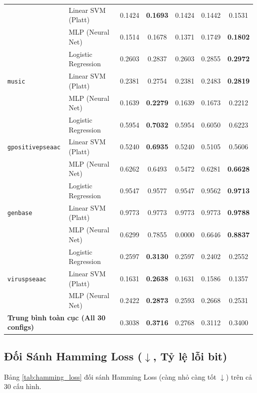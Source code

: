 \documentclass[10pt,a4paper,twoside]{article}
\begin{document}
\begin{table}[H]
{\begin{tabular}{llccccc}
 & Linear SVM (Platt) & 0.1424 & \textbf{0.1693} & 0.1424 & 0.1442 & 0.1531 \\
 & MLP (Neural Net) & 0.1514 & 0.1678 & 0.1371 & 0.1749 & \textbf{0.1802} \\
\midrule
\multirow{3}{*}{\texttt{music}} & Logistic Regression & 0.2603 & 0.2837 & 0.2603 & 0.2855 & \textbf{0.2972} \\
 & Linear SVM (Platt) & 0.2381 & 0.2754 & 0.2381 & 0.2483 & \textbf{0.2819} \\
 & MLP (Neural Net) & 0.1639 & \textbf{0.2279} & 0.1639 & 0.1673 & 0.2212 \\
\midrule
\multirow{3}{*}{\texttt{gpositivepseaac}} & Logistic Regression & 0.5954 & \textbf{0.7032} & 0.5954 & 0.6050 & 0.6223 \\
 & Linear SVM (Platt) & 0.5240 & \textbf{0.6935} & 0.5240 & 0.5105 & 0.5606 \\
 & MLP (Neural Net) & 0.6262 & 0.6493 & 0.5472 & 0.6281 & \textbf{0.6628} \\
\midrule
\multirow{3}{*}{\texttt{genbase}} & Logistic Regression & 0.9547 & 0.9577 & 0.9547 & 0.9562 & \textbf{0.9713} \\
 & Linear SVM (Platt) & 0.9773 & 0.9773 & 0.9773 & 0.9773 & \textbf{0.9788} \\
 & MLP (Neural Net) & 0.6299 & 0.7855 & 0.0000 & 0.6646 & \textbf{0.8837} \\
\midrule
\multirow{3}{*}{\texttt{viruspseaac}} & Logistic Regression & 0.2597 & \textbf{0.3130} & 0.2597 & 0.2402 & 0.2552 \\
 & Linear SVM (Platt) & 0.1631 & \textbf{0.2638} & 0.1631 & 0.1586 & 0.1357 \\
 & MLP (Neural Net) & 0.2422 & \textbf{0.2873} & 0.2593 & 0.2668 & 0.2531 \\
\midrule
\multicolumn{2}{l}{\textbf{Trung bình toàn cục (All 30 configs)}} & 0.3038 & \textbf{0.3716} & 0.2768 & 0.3112 & 0.3400 \\
\bottomrule
\end{tabular}%
}
\end{table}
\clearpage
\subsection{Đối Sánh Hamming Loss \texorpdfstring{($\downarrow$, Tỷ lệ lỗi bit)}{(Giam, Ty le loi bit)}}
Bảng \ref{tab:hamming_loss} đối sánh Hamming Loss (càng nhỏ càng tốt $\downarrow$) trên cả 30 cấu hình.
\end{document}

